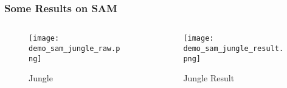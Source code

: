 \begin{frame}
    \frametitle{Some Results on SAM}
    \begin{columns}[c] %
        \begin{column}{0.48\textwidth} %
            \begin{figure}
                \texttt{[image: demo\_sam\_jungle\_raw.png]}
                \caption{Jungle}
            \end{figure}
        \end{column}
        \begin{column}{0.48\textwidth} %
            \begin{figure}
                \texttt{[image: demo\_sam\_jungle\_result.png]}
                \caption{Jungle Result}
            \end{figure}
        \end{column}
    \end{columns}
\end{frame}
